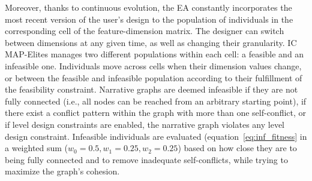 





Moreover, thanks to continuous evolution, the EA constantly incorporates the most recent version of the user’s design to the population of individuals in the corresponding cell of the feature-dimension matrix. The designer can switch between dimensions at any given time, as well as changing their granularity. IC MAP-Elites manages two different populations within each cell: a feasible and an infeasible one. Individuals move across cells when their dimension values change, or between the feasible and infeasible population according to their fulfillment of the feasibility constraint. Narrative graphs are deemed infeasible if they are not fully connected (i.e., all nodes can be reached from an arbitrary starting point), if there exist a conflict pattern within the graph with more than one self-conflict, or if level design constraints are enabled, the narrative graph violates any level design constraint. Infeasible individuals are evaluated (equation~\ref{eq:inf_fitness} in a weighted sum ($w_{0}=0.5, w_{1}=0.25, w_{2}=0.25$) based on how close they are to being fully connected and to remove inadequate self-conflicts, while trying to maximize the graph's cohesion.

